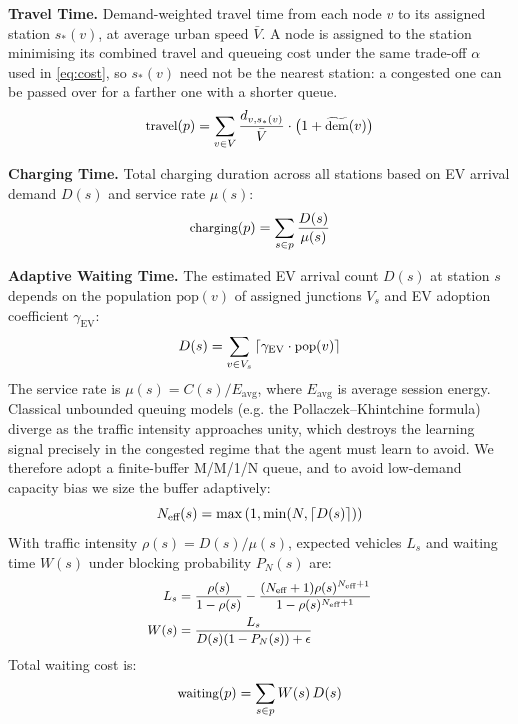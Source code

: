 \documentclass[10pt, conference, a4paper, compsocconf]{IEEEtran}
\begin{document}
\textbf{Travel Time.} Demand-weighted travel time from each node $v$ to its assigned station $s_*(v)$, at average urban speed $\bar{V}$. A node is assigned to the station minimising its combined travel and queueing cost under the same trade-off $\alpha$ used in \eqref{eq:cost}, so $s_*(v)$ need not be the nearest station: a congested one can be passed over for a farther one with a shorter queue.
\begin{equation}\small
\text{travel}(p) = \sum_{v \in V} \frac{d_{v, s_*(v)}}{\bar{V}} \cdot \big( 1 + \widetilde{\text{dem}}(v) \big)
\end{equation}

\textbf{Charging Time.} Total charging duration across all stations based on EV arrival demand $D(s)$ and service rate $\mu(s)$:
\begin{equation}\small
\text{charging}(p) = \sum_{s \in p} \frac{D(s)}{\mu(s)}
\end{equation}

\textbf{Adaptive Waiting Time.} The estimated EV arrival count $D(s)$ at station $s$ depends on the population $\text{pop}(v)$ of assigned junctions $V_s$ and EV adoption coefficient $\gamma_{\text{EV}}$:
\begin{equation}\small
D(s) = \sum_{v \in V_s} \left\lceil \gamma_{\text{EV}} \cdot \text{pop}(v) \right\rceil
\end{equation}
The service rate is $\mu(s) = C(s) / E_{\text{avg}}$, where $E_{\text{avg}}$ is average session energy. Classical unbounded queuing models (e.g. the Pollaczek–Khintchine formula) diverge as the traffic intensity approaches unity, which destroys the learning signal precisely in the congested regime that the agent must learn to avoid. We therefore adopt a finite-buffer M/M/1/N queue, and to avoid low-demand capacity bias we size the buffer adaptively:
\begin{equation}\small
N_{\text{eff}}(s) = \max \left(1, \min (N, \lceil D(s) \rceil) \right)
\end{equation}
With traffic intensity $\rho(s) = D(s)/\mu(s)$, expected vehicles $L_s$ and waiting time $W(s)$ under blocking probability $P_N(s)$ are:
\begin{equation}\small
\begin{aligned}
L_s &= \frac{\rho(s)}{1 - \rho(s)} - \frac{(N_{\text{eff}} + 1) \rho(s)^{N_{\text{eff}}+1}}{1 - \rho(s)^{N_{\text{eff}}+1}} \\
W(s) &= \frac{L_s}{D(s) (1 - P_N(s)) + \epsilon}
\end{aligned}
\end{equation}
Total waiting cost is:
\begin{equation}\small
\text{waiting}(p) = \sum_{s \in p} W(s) \, D(s)
\end{equation}
\end{document}
